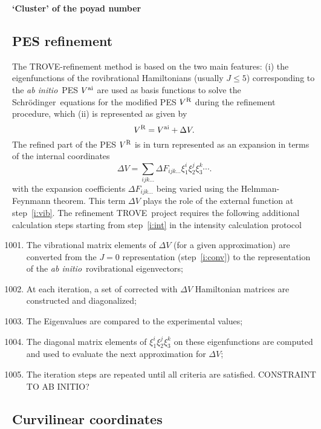 \documentclass[12pt]{article}
\newcommand{\red}[1]{{\color{red} #1}}
\newcommand{\trove}{{\sc TROVE}}
\newcommand{\schr}{Schr\"{o}dinger}
\newcommand{\ai}{\textit{ab initio}}
\newcommand{\2}{$_{2}$}
\newcommand{\3}{$_{3}$}
\newcommand{\4}{$_{4}$}
\begin{document}
\textbf{`Cluster' of the poyad number}


\subsection{PES refinement}


The \trove-refinement method \cite{11YuBaTe.NH3} is based on the two main features: (i) the eigenfunctions of the rovibrational Hamiltonians (usually $J\le 5$) corresponding to the \ai\ PES $V^{\rm ai}$ are used as basis functions to solve the \schr\ equations for the modified PES  $V^{\rm R}$ during the refinement procedure, which (ii) is represented as given by
\begin{equation}
V^{\rm R} = V^{\rm ai} + \Delta V.
\end{equation}
The refined part of the PES $V^{\rm R}$ is in turn represented as an expansion in terms of the internal coordinates
\begin{equation}
\Delta V = \sum_{ijk\ldots} \Delta F_{ijk\ldots } \xi_1^i \xi_2^j \xi_3^k \cdots .
\end{equation}
with the expansion coefficients $\Delta F_{ijk\ldots }$
being varied using the Helmman-Feynmann theorem. This term $\Delta V$ plays the role of the external function at step~\ref{i:vib}.  The refinement \trove\ project requires the following additional calculation steps starting from step~\ref{i:int} in the intensity calculation protocol
\begin{enumerate}
 \setcounter{enumi}{1000}
  \item The vibrational matrix elements of  $\Delta V$ (for a given approximation) are converted from the $J=0$ representation (step~\ref{i:conv}) to the representation of the \ai\ rovibrational eigenvectors;
  \item At each iteration, a set of corrected with $\Delta V$ Hamiltonian matrices are constructed and diagonalized;
  \item The Eigenvalues are compared to the experimental values;
  \item The diagonal matrix elements of $\xi_1^i \xi_2^j \xi_3^k$ on these eigenfunctions are computed and used to evaluate the next approximation for $\Delta V$;
  \item The iteration steps are repeated until all criteria are satisfied.
  \red{CONSTRAINT TO AB INITIO?}

\end{enumerate}


\subsection{Curvilinear coordinates}
\end{document}
